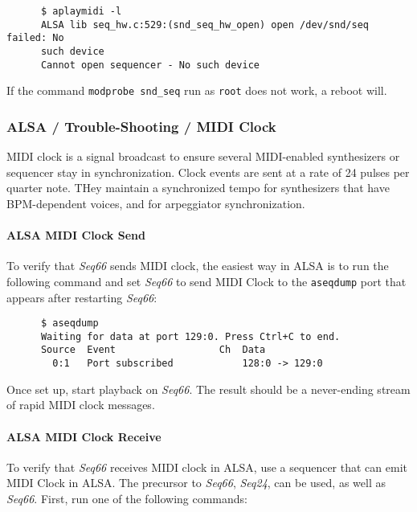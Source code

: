    \begin{verbatim}
      $ aplaymidi -l
      ALSA lib seq_hw.c:529:(snd_seq_hw_open) open /dev/snd/seq failed: No
      such device
      Cannot open sequencer - No such device
   \end{verbatim}

   If the command \texttt{modprobe snd\_seq} run as \texttt{root} does
   not work, a reboot will.

\subsubsection{ALSA / Trouble-Shooting / MIDI Clock}
\label{subsubsec:alsa_testing_midi_clock}

   MIDI clock is a signal broadcast to ensure
   several MIDI-enabled synthesizers or sequencer stay in
   synchronization. Clock events are sent at a rate of 24 pulses per quarter
   note.  THey maintain a synchronized tempo for synthesizers
   that have BPM-dependent voices, and for arpeggiator synchronization.

\paragraph{ALSA MIDI Clock Send}
\label{paragraph:alsa_testing_midi_clock_send}

   To verify that \textsl{Seq66} sends MIDI clock, the easiest way in
   ALSA is to run the following command and set \textsl{Seq66} to send
   MIDI Clock to the \texttt{aseqdump} port that appears after restarting
   \textsl{Seq66}:

   \begin{verbatim}
      $ aseqdump
      Waiting for data at port 129:0. Press Ctrl+C to end.
      Source  Event                  Ch  Data
        0:1   Port subscribed            128:0 -> 129:0
   \end{verbatim}

   Once set up, start playback on \textsl{Seq66}.
   The result should be a never-ending stream of rapid MIDI clock messages.

\paragraph{ALSA MIDI Clock Receive}
\label{paragraph:alsa_testing_midi_clock_receive}

   To verify that \textsl{Seq66} receives MIDI clock in ALSA, use a sequencer
   that can emit MIDI Clock in ALSA.  The precursor to \textsl{Seq66},
   \textsl{Seq24}, can be used, as well as \textsl{Seq66}.
   First, run one of the following commands:

